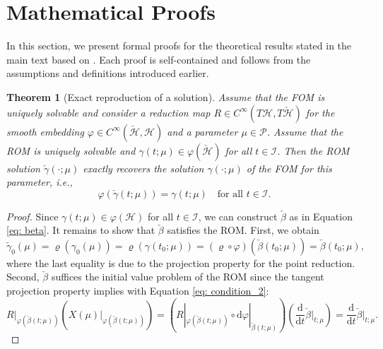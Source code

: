 \documentclass{article}
\theoremstyle{plain}
\newtheorem{theorem}{Theorem}[section]
\theoremstyle{definition}
\theoremstyle{remark}
\begin{document}
\section{Mathematical Proofs}
In this section, we present formal proofs for the theoretical results stated in the main text based on \cite{buchfink2024modelreductionmanifoldsdifferential}. Each proof is self-contained and follows from the assumptions and definitions introduced earlier.
\begin{theorem}[Exact reproduction of a solution]
Assume that the FOM  is uniquely solvable and consider a reduction map $R \in C^{\infty}(T\mathcal{H}, T\check{\mathcal{H}})$ for the smooth embedding $\varphi \in C^{\infty}(\check{\mathcal{H}}, \mathcal{H})$ and a parameter $\mu \in \mathcal{P}$. Assume that the ROM is uniquely solvable and $\gamma(t; \mu) \in \varphi(\check{\mathcal{H}})$ for all $t \in \mathcal{I}$. Then the ROM solution $\check{\gamma}(\cdot; \mu)$ exactly recovers the solution $\gamma(\cdot; \mu)$ of the FOM  for this parameter, i.e.,
\begin{equation}
\varphi(\check{\gamma}(t; \mu)) = \gamma(t; \mu) \quad \text{for all } t \in \mathcal{I}.
\end{equation}
\end{theorem}
\begin{proof}
Since $\gamma(t; \mu) \in \varphi(\mathcal{H})$ for all $t \in \mathcal{I}$, we can construct $\check{\beta}$ as in Equation \ref{eq: beta}. It remains to show that $\check{\beta}$ satisfies the ROM. First, we obtain
\begin{equation}
\check{\gamma}_0(\mu) = \varrho(\gamma_0(\mu)) = \varrho(\gamma(t_0; \mu)) = (\varrho \circ \varphi)\left(\check{\beta}(t_0; \mu)\right) = \check{\beta}(t_0; \mu),
\end{equation}
where the last equality is due to the projection property for the point reduction. Second, $\check{\beta}$ suffices the initial value problem of the ROM since the tangent projection property implies with Equation \ref{eq: condition_2}:
\begin{equation}
R|_{\varphi(\check{\beta}(t;\mu))}\left(X(\mu)|_{\varphi(\check{\beta}(t;\mu))}\right) = \left(R|_{\varphi(\check{\beta}(t;\mu))} \circ \mathrm{d}\varphi|_{\check{\beta}(t;\mu)}\right)\left(\frac{\mathrm{d}}{\mathrm{d}t}\check{\beta}\bigg|_{t;\mu}\right) = \frac{\mathrm{d}}{\mathrm{d}t}\check{\beta}\bigg|_{t;\mu}. 
\end{equation}
\end{proof}
\end{document}
